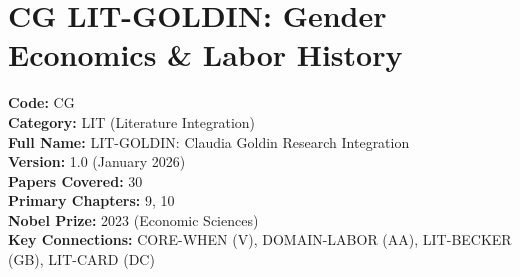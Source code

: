 %
%

\chapter{CG LIT-GOLDIN: Gender Economics \& Labor History}
\label{app:lit-goldin}

\begin{tcolorbox}[colback=blue!5!white, colframe=blue!75!black, title=Appendix Metadata]
\textbf{Code:} CG \\
\textbf{Category:} LIT (Literature Integration) \\
\textbf{Full Name:} LIT-GOLDIN: Claudia Goldin Research Integration \\
\textbf{Version:} 1.0 (January 2026) \\
\textbf{Papers Covered:} 30 \\
\textbf{Primary Chapters:} 9, 10 \\
\textbf{Nobel Prize:} 2023 (Economic Sciences) \\
\textbf{Key Connections:} CORE-WHEN (V), DOMAIN-LABOR (AA), LIT-BECKER (GB), LIT-CARD (DC)
\end{tcolorbox}

